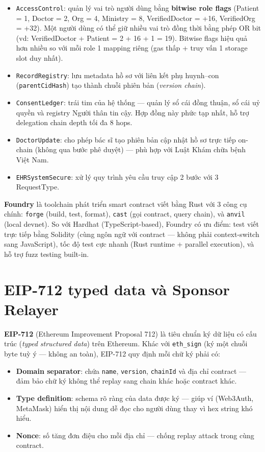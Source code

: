 \documentclass[../DoAn]{subfiles}
\begin{document}
\begin{itemize}
    \item \texttt{AccessControl}: quản lý vai trò người dùng bằng \textbf{bitwise role flags} (Patient = 1, Doctor = 2, Org = 4, Ministry = 8, VerifiedDoctor = +16, VerifiedOrg = +32). Một người dùng có thể giữ nhiều vai trò đồng thời bằng phép OR bit (vd: VerifiedDoctor + Patient = 2 + 16 + 1 = 19). Bitwise flags hiệu quả hơn nhiều so với mỗi role 1 mapping riêng (gas thấp + truy vấn 1 storage slot duy nhất).
    \item \texttt{RecordRegistry}: lưu metadata hồ sơ với liên kết phụ huynh--con (\texttt{parentCidHash}) tạo thành chuỗi phiên bản (\textit{version chain}).
    \item \texttt{ConsentLedger}: trái tim của hệ thống --- quản lý sổ cái đồng thuận, sổ cái uỷ quyền và registry Người thân tin cậy. Hợp đồng này phức tạp nhất, hỗ trợ delegation chain depth tối đa 8 hops.
    \item \texttt{DoctorUpdate}: cho phép bác sĩ tạo phiên bản cập nhật hồ sơ trực tiếp on-chain (không qua bước phê duyệt) --- phù hợp với Luật Khám chữa bệnh Việt Nam.
    \item \texttt{EHRSystemSecure}: xử lý quy trình yêu cầu truy cập 2 bước với 3 RequestType.
\end{itemize}

\textbf{Foundry} \cite{foundry} là toolchain phát triển smart contract viết bằng Rust với 3 công cụ chính: \texttt{forge} (build, test, format), \texttt{cast} (gọi contract, query chain), và \texttt{anvil} (local devnet). So với Hardhat (TypeScript-based), Foundry có ưu điểm: test viết trực tiếp bằng Solidity (cùng ngôn ngữ với contract --- không phải context-switch sang JavaScript), tốc độ test cực nhanh (Rust runtime + parallel execution), và hỗ trợ fuzz testing built-in.

\section{EIP-712 typed data và Sponsor Relayer}

\textbf{EIP-712} (Ethereum Improvement Proposal 712) \cite{eip712} là tiêu chuẩn ký dữ liệu có cấu trúc (\textit{typed structured data}) trên Ethereum. Khác với \texttt{eth\_sign} (ký một chuỗi byte tuỳ ý --- không an toàn), EIP-712 quy định mỗi chữ ký phải có:

\begin{itemize}
    \item \textbf{Domain separator}: chứa \texttt{name}, \texttt{version}, \texttt{chainId} và địa chỉ contract --- đảm bảo chữ ký không thể replay sang chain khác hoặc contract khác.
    \item \textbf{Type definition}: schema rõ ràng của data được ký --- giúp ví (Web3Auth, MetaMask) hiển thị nội dung dễ đọc cho người dùng thay vì hex string khó hiểu.
    \item \textbf{Nonce}: số tăng đơn điệu cho mỗi địa chỉ --- chống replay attack trong cùng contract.
\end{itemize}
\end{document}

